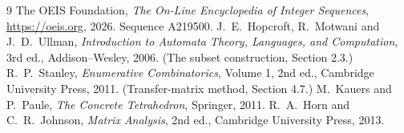 \documentclass[11pt,a4paper]{article}
\theoremstyle{plain}
\theoremstyle{definition}
\begin{document}
\begin{thebibliography}{9}
 The OEIS Foundation, \emph{The On-Line Encyclopedia of Integer
Sequences}, \url{https://oeis.org}, 2026. Sequence A219500.
 J.~E.~Hopcroft, R.~Motwani and J.~D.~Ullman, \emph{Introduction to Automata
Theory, Languages, and Computation}, 3rd ed., Addison--Wesley, 2006. (The subset
construction, Section 2.3.)
 R.~P.~Stanley, \emph{Enumerative Combinatorics}, Volume 1, 2nd ed.,
Cambridge University Press, 2011. (Transfer-matrix method, Section 4.7.)
 M.~Kauers and P.~Paule, \emph{The Concrete Tetrahedron}, Springer, 2011.
 R.~A.~Horn and C.~R.~Johnson, \emph{Matrix Analysis}, 2nd ed., Cambridge
University Press, 2013.
\end{thebibliography}
\end{document}
